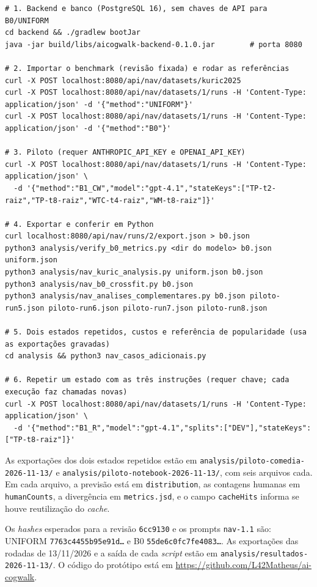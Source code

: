 \documentclass[12pt,oneside,a4paper,chapter=TITLE,english,brazil]{abntex2}
\newcommand{\code}[1]{\texttt{#1}}
\begin{document}
\begin{apendicesenv}
\begin{lstlisting}
# 1. Backend e banco (PostgreSQL 16), sem chaves de API para B0/UNIFORM
cd backend && ./gradlew bootJar
java -jar build/libs/aicogwalk-backend-0.1.0.jar        # porta 8080

# 2. Importar o benchmark (revisão fixada) e rodar as referências
curl -X POST localhost:8080/api/nav/datasets/kuric2025
curl -X POST localhost:8080/api/nav/datasets/1/runs -H 'Content-Type: application/json' -d '{"method":"UNIFORM"}'
curl -X POST localhost:8080/api/nav/datasets/1/runs -H 'Content-Type: application/json' -d '{"method":"B0"}'

# 3. Piloto (requer ANTHROPIC_API_KEY e OPENAI_API_KEY)
curl -X POST localhost:8080/api/nav/datasets/1/runs -H 'Content-Type: application/json' \
  -d '{"method":"B1_CW","model":"gpt-4.1","stateKeys":["TP-t2-raiz","TP-t8-raiz","WTC-t4-raiz","WM-t8-raiz"]}'

# 4. Exportar e conferir em Python
curl localhost:8080/api/nav/runs/2/export.json > b0.json
python3 analysis/verify_b0_metrics.py <dir do modelo> b0.json uniform.json
python3 analysis/nav_kuric_analysis.py uniform.json b0.json
python3 analysis/nav_b0_crossfit.py b0.json
python3 analysis/nav_analises_complementares.py b0.json piloto-run5.json piloto-run6.json piloto-run7.json piloto-run8.json

# 5. Dois estados repetidos, custos e referência de popularidade (usa as exportações gravadas)
cd analysis && python3 nav_casos_adicionais.py

# 6. Repetir um estado com as três instruções (requer chave; cada execução faz chamadas novas)
curl -X POST localhost:8080/api/nav/datasets/1/runs -H 'Content-Type: application/json' \
  -d '{"method":"B1_R","model":"gpt-4.1","splits":["DEV"],"stateKeys":["TP-t8-raiz"]}'
\end{lstlisting}

As exportações dos dois estados repetidos estão em \code{analysis/piloto-comedia-2026-11-13/} e \code{analysis/piloto-notebook-2026-11-13/}, com seis arquivos cada. Em cada arquivo, a previsão está em \code{distribution}, as contagens humanas em \code{humanCounts}, a divergência em \code{metrics.jsd}, e o campo \code{cacheHits} informa se houve reutilização do \textit{cache}.

Os \textit{hashes} esperados para a revisão \code{6cc9130} e os prompts \code{nav-1.1} são: UNIFORM \code{7763c4455b95e91d\ldots} e B0 \code{55de6c0fc7fe4083\ldots}. As exportações das rodadas de 13/11/2026 e a saída de cada \textit{script} estão em \code{analysis/resultados-2026-11-13/}. O código do protótipo está em \url{https://github.com/L42Matheus/ai-cogwalk}.


\end{apendicesenv}
\end{document}
